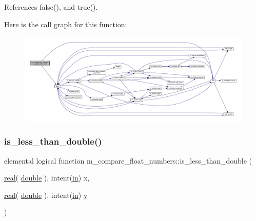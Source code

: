 References false(), and true().

Here is the call graph for this function\+:
\nopagebreak
\begin{figure}[H]
\begin{center}
\leavevmode
\includegraphics[width=350pt]{namespacem__compare__float__numbers_ab525ef9c044e5187643e04c64d470186_cgraph}
\end{center}
\end{figure}
\mbox{\label{namespacem__compare__float__numbers_a36578a1fa0cf4ee3d29ded529dbd156c}} 
\subsubsection{\texorpdfstring{is\+\_\+less\+\_\+than\+\_\+double()}{is\_less\_than\_double()}}
{\footnotesize\ttfamily elemental logical function m\+\_\+compare\+\_\+float\+\_\+numbers\+::is\+\_\+less\+\_\+than\+\_\+double (\begin{DoxyParamCaption}\item[{\hyperlink{read__watch_83_8txt_abdb62bde002f38ef75f810d3a905a823}{real}( \hyperlink{namespacem__compare__float__numbers_af4b789cd6e1a2abcd412eaf29e91ea0c}{double} ), intent(\hyperlink{M__journal_83_8txt_afce72651d1eed785a2132bee863b2f38}{in})}]{x,  }\item[{\hyperlink{read__watch_83_8txt_abdb62bde002f38ef75f810d3a905a823}{real}( \hyperlink{namespacem__compare__float__numbers_af4b789cd6e1a2abcd412eaf29e91ea0c}{double} ), intent(\hyperlink{M__journal_83_8txt_afce72651d1eed785a2132bee863b2f38}{in})}]{y }\end{DoxyParamCaption})\hspace{0.3cm}{\ttfamily [private]}}



